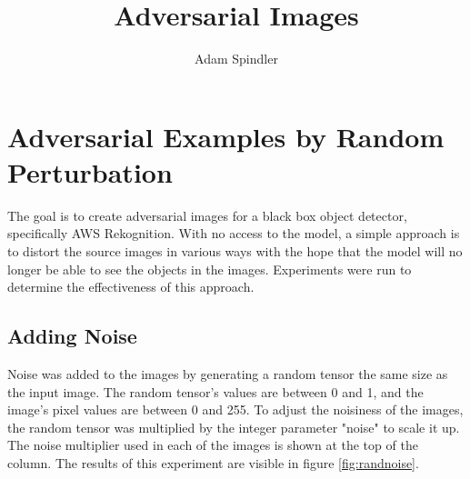 \documentclass{article}
\title{Adversarial Images}
\author{Adam Spindler}
\begin{document}
\maketitle

\section{Adversarial Examples by Random Perturbation}

The goal is to create adversarial images for a black box object detector, specifically AWS Rekognition. With no access to the model, a simple approach is to distort the source images in various ways with the hope that the model will no longer be able to see the objects in the images. Experiments were run to determine the effectiveness of this approach.

\subsection{Adding Noise}
Noise was added to the images by generating a random tensor the same size as the input image. The random tensor's values are between 0 and 1, and the image's pixel values are between 0 and 255. To adjust the noisiness of the images, the random tensor was multiplied by the integer parameter "noise" to scale it up. The noise multiplier used in each of the images is shown at the top of the column. The results of this experiment are visible in figure \ref{fig:randnoise}.
\end{document}
